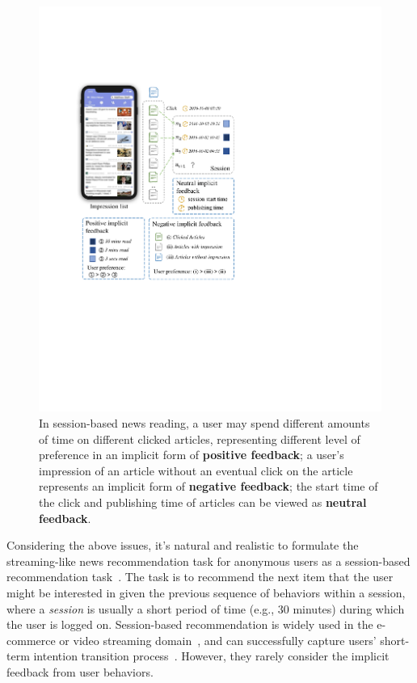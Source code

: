 \begin{figure}[th]
    \centering
    \includegraphics[width=0.9\columnwidth]{fig/stream.pdf}
    \caption{In session-based news reading, 
    a user may spend different amounts of time on different clicked articles, 
representing different level of preference in an implicit form of 
\textbf{positive feedback}; 
a user's impression of an article without an eventual click on the
article represents an implicit form of \textbf{negative feedback}; 
the start time of the click and publishing time of articles can be viewed 
as \textbf{neutral feedback}.}
\label{fig:session}
\end{figure}

Considering the above issues, it's natural and realistic to formulate the 
streaming-like news recommendation task for anonymous users as 
a session-based recommendation task~\cite{sottocornola2018session,gabriel2019contextual,zhang2019dynamic,zhang2018deep,symeonidis2021session}. 
The task is to recommend the next item that the user might be interested 
in given the previous sequence of behaviors within a session, 
where a \textit{session} is usually 
a short period of time (e.g., 30 minutes) during which the user is logged on.
Session-based recommendation is widely used in the e-commerce or 
video streaming domain~\cite{xu2019time,pan2020star}, and can successfully capture
users' short-term intention transition process~\cite{epure_recommending_2017,symeonidis2020session}. However, they rarely consider the implicit feedback from user behaviors.

